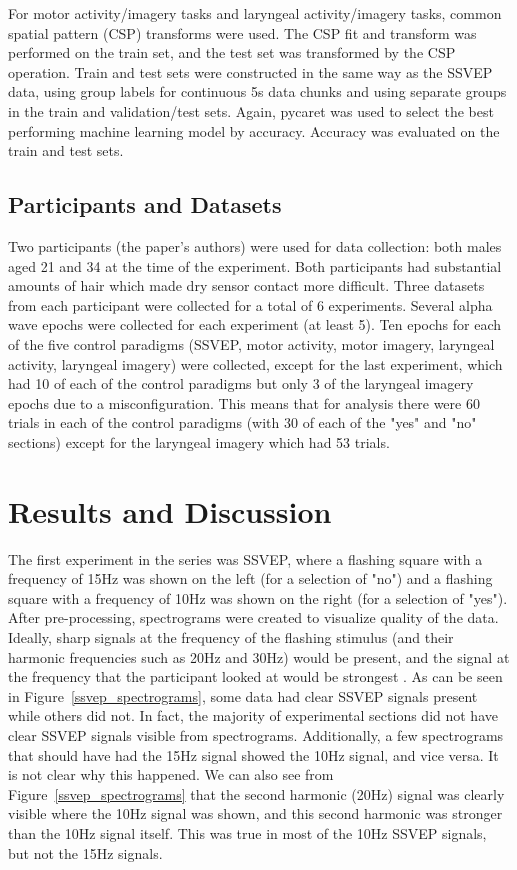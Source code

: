 \documentclass{article}
\begin{document}
For motor activity/imagery tasks and laryngeal activity/imagery tasks, common spatial pattern (CSP) transforms were used. The CSP fit and transform was performed on the train set, and the test set was transformed by the CSP operation. Train and test sets were constructed in the same way as the SSVEP data, using group labels for continuous 5s data chunks and using separate groups in the train and validation/test sets. Again, pycaret was used to select the best performing machine learning model by accuracy. Accuracy was evaluated on the train and test sets.

\subsection{Participants and Datasets}
Two participants (the paper's authors) were used for data collection: both males aged 21 and 34 at the time of the experiment. Both participants had substantial amounts of hair which made dry sensor contact more difficult. Three datasets from each participant were collected for a total of 6 experiments. Several alpha wave epochs were collected for each experiment (at least 5). Ten epochs for each of the five control paradigms (SSVEP, motor activity, motor imagery, laryngeal activity, laryngeal imagery) were collected, except for the last experiment, which had 10 of each of the control paradigms but only 3 of the laryngeal imagery epochs due to a misconfiguration. This means that for analysis there were 60 trials in each of the control paradigms (with 30 of each of the "yes" and "no" sections) except for the laryngeal imagery which had 53 trials.

\section{Results and Discussion}
The first experiment in the series was SSVEP, where a flashing square with a frequency of 15Hz was shown on the left (for a selection of "no") and a flashing square with a frequency of 10Hz was shown on the right (for a selection of "yes"). After pre-processing, spectrograms were created to visualize quality of the data. Ideally, sharp signals at the frequency of the flashing stimulus (and their harmonic frequencies such as 20Hz and 30Hz) would be present, and the signal at the frequency that the participant looked at would be strongest \citep{Rezeika2018, 6775293}. As can be seen in Figure~\ref{ssvep_spectrograms}, some data had clear SSVEP signals present while others did not. In fact, the majority of experimental sections did not have clear SSVEP signals visible from spectrograms. Additionally, a few spectrograms that should have had the 15Hz signal showed the 10Hz signal, and vice versa. It is not clear why this happened. We can also see from Figure~\ref{ssvep_spectrograms} that the second harmonic (20Hz) signal was clearly visible where the 10Hz signal was shown, and this second harmonic was stronger than the 10Hz signal itself. This was true in most of the 10Hz SSVEP signals, but not the 15Hz signals.
\end{document}
